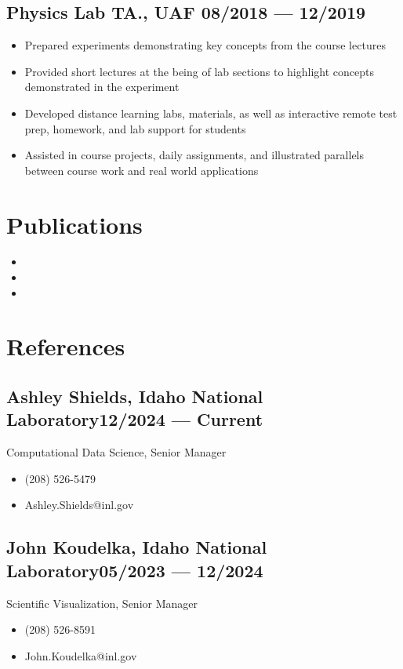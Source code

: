 \documentclass[letterpaper,11pt]{article}
\begin{document}

\subsection*{{\color{cvblue} Physics Lab TA., UAF } \hfill 08/2018 --- 12/2019} 
\begin{itemize}
    \setlength{\itemsep}{-.5pt}
    \item Prepared experiments demonstrating key concepts from the course lectures
    \item Provided short lectures at the being of lab sections to highlight concepts demonstrated in the experiment
    \item Developed distance learning labs, materials, as well as interactive remote test prep, homework, and lab support for students
    \item Assisted in course projects, daily assignments, and illustrated parallels between course work and real world applications
\end{itemize}

\section*{\color{cvblue}Publications}
\begin{itemize}
    \item {}
    \item {}
    \item {}
\end{itemize}


\section*{\color{cvblue}References} 

\subsection*{{\color{cvblue}Ashley Shields,} Idaho National Laboratory\hfill 12/2024 --- Current}
Computational Data Science, Senior Manager
\begin{itemize}
    \setlength{\itemsep}{-.5pt}
    \item (208) 526-5479
    \item Ashley.Shields@inl.gov
\end{itemize}
 
\subsection*{{\color{cvblue}John Koudelka,} Idaho National Laboratory\hfill 05/2023 --- 12/2024}
Scientific Visualization, Senior Manager
\begin{itemize}
    \setlength{\itemsep}{-.5pt}
    \item (208) 526-8591
    \item John.Koudelka@inl.gov
\end{itemize}
 
\end{document}

